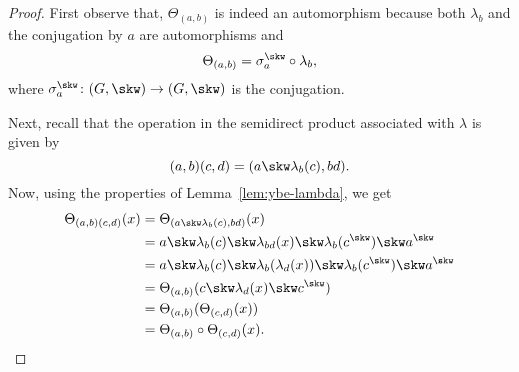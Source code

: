 \begin{proof}
    First observe that, $\Theta_{(a,b)}$ is indeed an automorphism because both $\lambda_b$ and the conjugation by $a$ are automorphisms and
    $$
        \Theta_{(a,b)}=\sigma_a^\skw\circ\lambda_b,
    $$
    where $\sigma_a^\skw\colon(G,\skw)\to(G,\skw)$ is the conjugation.

    Next, recall that the operation in the semidirect product associated with $\lambda$ is given by
    $$
        (a,b)(c,d) = (a\skw\lambda_b(c),bd).
    $$
    Now, using the properties of Lemma~\ref{lem:ybe-lambda}, we get
    \begin{align*}
        \Theta_{(a,b)(c,d)}(x) &= \Theta_{(a\skw\lambda_b(c),bd)}(x)\\
            &= a\skw\lambda_b(c)\skw\lambda_{bd}(x)
                \skw\lambda_b(c^\skw)\skw a^\skw\\
            &= a\skw\lambda_b(c)\skw\lambda_b(\lambda_d(x))
                \skw\lambda_b(c^\skw)\skw a^\skw\\
            &= \Theta_{(a,b)}(c\skw\lambda_d(x)\skw c^\skw)\\
            &= \Theta_{(a,b)}(\Theta_{(c,d)}(x))\\
            &= \Theta_{(a,b)}\circ\Theta_{(c,d)}(x).
    \end{align*}
\end{proof}

